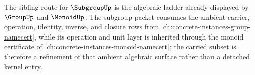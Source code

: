 The sibling route for $\SubgroupUp$ is the algebraic ladder already displayed by $\GroupUp$ and $\MonoidUp$. The subgroup packet consumes the ambient carrier, operation, identity, inverse, and closure rows from \autoref{ch:concrete-instances-group-namecert}, while its operation and unit layer is inherited through the monoid certificate of \autoref{ch:concrete-instances-monoid-namecert}; the carried subset is therefore a refinement of that ambient algebraic surface rather than a detached kernel entry.
